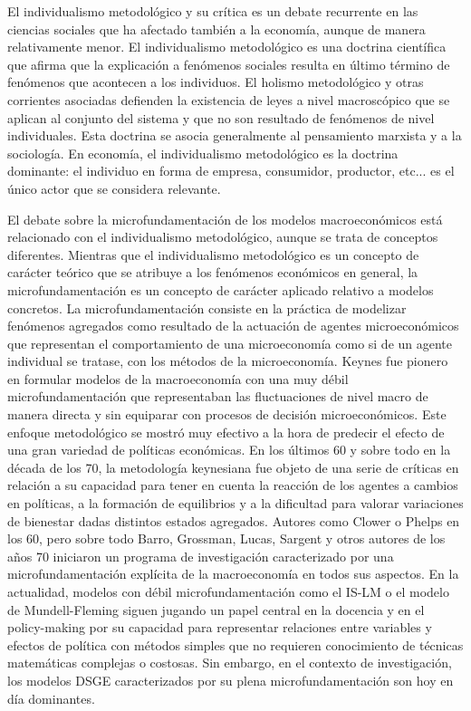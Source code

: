 \documentclass{nuevotema}
\begin{document}
El individualismo metodológico y su crítica es un debate recurrente en las ciencias sociales que ha afectado también a la economía, aunque de manera relativamente menor. El individualismo metodológico es una doctrina científica que afirma que la explicación a fenómenos sociales resulta en último término de fenómenos que acontecen a los individuos. El holismo metodológico y otras corrientes asociadas defienden la existencia de leyes a nivel macroscópico que se aplican al conjunto del sistema y que no son resultado de fenómenos de nivel individuales. Esta doctrina se asocia generalmente al pensamiento marxista y a la sociología. En economía, el individualismo metodológico es la doctrina dominante: el individuo en forma de empresa, consumidor, productor, etc... es el único actor que se considera relevante. 

El debate sobre la microfundamentación de los modelos macroeconómicos está relacionado con el individualismo metodológico, aunque se trata de conceptos diferentes. Mientras que el individualismo metodológico es un concepto de carácter teórico que se atribuye a los fenómenos económicos en general, la microfundamentación es un concepto de carácter aplicado relativo a modelos concretos. La microfundamentación consiste en la práctica de modelizar fenómenos agregados como resultado de la actuación de agentes microeconómicos que representan el comportamiento de una microeconomía como si de un agente individual se tratase, con los métodos de la microeconomía. Keynes fue pionero en formular modelos de la macroeconomía con una muy débil microfundamentación que representaban las fluctuaciones de nivel macro de manera directa y sin equiparar con procesos de decisión microeconómicos. Este enfoque metodológico se mostró muy efectivo a la hora de predecir el efecto de una gran variedad de políticas económicas. En los últimos 60 y sobre todo en la década de los 70, la metodología keynesiana fue objeto de una serie de críticas en relación a su capacidad para tener en cuenta la reacción de los agentes a cambios en políticas, a la formación de equilibrios y a la dificultad para valorar variaciones de bienestar dadas distintos estados agregados. Autores como Clower o Phelps en los 60, pero sobre todo Barro, Grossman, Lucas, Sargent y otros autores de los años 70 iniciaron un programa de investigación caracterizado por una microfundamentación explícita de la macroeconomía en todos sus aspectos. En la actualidad, modelos con débil microfundamentación como el IS-LM o el modelo de Mundell-Fleming siguen jugando un papel central en la docencia y en el policy-making por su capacidad para representar relaciones entre variables y efectos de política con métodos simples que no requieren conocimiento de técnicas matemáticas complejas o costosas. Sin embargo, en el contexto de investigación, los modelos DSGE caracterizados por su plena microfundamentación son hoy en día dominantes. 
\end{document}
